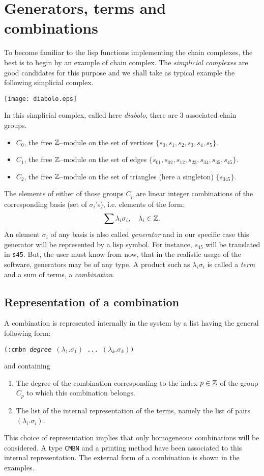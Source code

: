 \section {Generators, terms and combinations}

To become familiar to the lisp functions implementing the chain complexes, the best is to begin
by an example of chain complex. The {\em simplicial complexes} are good candidates
for this purpose and we shall take as typical example the following simplicial
complex.
%
\vskip 0.50cm
\centerline{\texttt{[image: diabolo.eps]}}
\vskip 0.50cm
%
In this simplicial complex, called here {\em diabolo}, there are $3$ associated chain groups.
\begin{itemize}
\item $C_0$, the free ${\mathbb{Z}}$--module on the set of vertices $\{s_0,s_1,s_2,s_3,s_4,s_5 \}$.
\item $C_1$, the free ${\mathbb{Z}}$--module on the set of  edges
   $\{ s_{01}, s_{02}, s_{12}, s_{23}, s_{34}, s_{35}, s_{45} \}$.
\item $C_2$, the free ${\mathbb{Z}}$--module on the set of  triangles (here a singleton)
   $\{ s_{345} \}$.
\end{itemize}
The elements of either of those groups $C_p$ are linear integer combinations  of the
corresponding basis (set of $\sigma_i$'s), i.e. elements of the form:
$$ \sum {\lambda_i \sigma_i}, \quad \lambda_i \in {\mathbb{Z}}. $$
An element $\sigma_i$ of any basis is also called {\em generator} and in our specific case
this generator will be represented by a  lisp symbol. For instance,
$s_{45}$ will be translated in {\tt s45}. But, the user must know from now, that in the realistic
usage of the software, generators may be of any type.
A product such as $\lambda_i \sigma_i$ is called
a {\em term} and a sum of terms, a {\em combination}.

\subsection {Representation of a combination}

A combination is represented internally in the system by a  list
having the general following form:
\begin{center}
{\tt (:cmbn {\em degree} $(\lambda_1.\sigma_1)$ ... $(\lambda_k.\sigma_k)$)}
\end{center}
and containing
\begin{enumerate}
\item The degree of the combination  corresponding to the index $p \in {\mathbb{Z}}$  of the group
$C_p$ to which this combination belongs.
\item The  list of the internal representation of the terms, namely the list of pairs $(\lambda_i.\sigma_i)$.
\end{enumerate}
This choice of representation implies that only homogeneous combinations
will be considered. A type {\tt CMBN} and
a printing method have been associated to this internal representation. The external
form of a combination is shown in the  examples.


